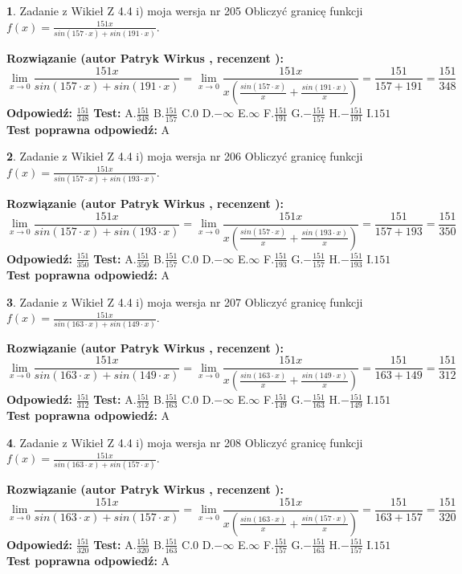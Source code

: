 \documentclass[12pt, a4paper]{article}
\theoremstyle{definition} %
\newtheorem{zad}{}
\newcommand{\zadStart}[1]{\begin{zad}#1\newline}
\newcommand{\zadStop}{\end{zad}}
\newcommand{\rozwStart}[2]{\noindent \textbf{Rozwiązanie (autor #1 , recenzent #2): }\newline}
\newcommand{\rozwStop}{\newline}
\newcommand{\odpStart}{\noindent \textbf{Odpowiedź:}\newline}
\newcommand{\odpStop}{\newline}
\newcommand{\testStart}{\noindent \textbf{Test:}\newline}
\newcommand{\testStop}{\newline}
\newcommand{\kluczStart}{\noindent \textbf{Test poprawna odpowiedź:}\newline}
\newcommand{\kluczStop}{\newline}
\begin{document}
\zadStart{Zadanie z Wikieł Z 4.4 i) moja wersja nr 205}
Obliczyć granicę funkcji $f(x)=\frac{151x}{sin(157\cdot x) +sin(191\cdot x)}$.
\zadStop
\rozwStart{Patryk Wirkus}{}
$$\lim\limits_{x\to 0}\frac{151x}{sin(157\cdot x) +sin(191\cdot x)}=\lim\limits_{x\to 0}\frac{151x}{x(\frac{sin(157\cdot x)}{x}+\frac{sin(191\cdot x)}{x})}=\frac{151}{157+191} = \frac{151}{348}$$
\rozwStop
\odpStart
$\frac{151}{348}$
\odpStop
\testStart
A.$\frac{151}{348}$
B.$\frac{151}{157}$
C.$0$
D.$-\infty$
E.$\infty$
F.$\frac{151}{191}$
G.$-\frac{151}{157}$
H.$-\frac{151}{191}$
I.$151$
\testStop
\kluczStart
A
\kluczStop



\zadStart{Zadanie z Wikieł Z 4.4 i) moja wersja nr 206}
Obliczyć granicę funkcji $f(x)=\frac{151x}{sin(157\cdot x) +sin(193\cdot x)}$.
\zadStop
\rozwStart{Patryk Wirkus}{}
$$\lim\limits_{x\to 0}\frac{151x}{sin(157\cdot x) +sin(193\cdot x)}=\lim\limits_{x\to 0}\frac{151x}{x(\frac{sin(157\cdot x)}{x}+\frac{sin(193\cdot x)}{x})}=\frac{151}{157+193} = \frac{151}{350}$$
\rozwStop
\odpStart
$\frac{151}{350}$
\odpStop
\testStart
A.$\frac{151}{350}$
B.$\frac{151}{157}$
C.$0$
D.$-\infty$
E.$\infty$
F.$\frac{151}{193}$
G.$-\frac{151}{157}$
H.$-\frac{151}{193}$
I.$151$
\testStop
\kluczStart
A
\kluczStop



\zadStart{Zadanie z Wikieł Z 4.4 i) moja wersja nr 207}
Obliczyć granicę funkcji $f(x)=\frac{151x}{sin(163\cdot x) +sin(149\cdot x)}$.
\zadStop
\rozwStart{Patryk Wirkus}{}
$$\lim\limits_{x\to 0}\frac{151x}{sin(163\cdot x) +sin(149\cdot x)}=\lim\limits_{x\to 0}\frac{151x}{x(\frac{sin(163\cdot x)}{x}+\frac{sin(149\cdot x)}{x})}=\frac{151}{163+149} = \frac{151}{312}$$
\rozwStop
\odpStart
$\frac{151}{312}$
\odpStop
\testStart
A.$\frac{151}{312}$
B.$\frac{151}{163}$
C.$0$
D.$-\infty$
E.$\infty$
F.$\frac{151}{149}$
G.$-\frac{151}{163}$
H.$-\frac{151}{149}$
I.$151$
\testStop
\kluczStart
A
\kluczStop



\zadStart{Zadanie z Wikieł Z 4.4 i) moja wersja nr 208}
Obliczyć granicę funkcji $f(x)=\frac{151x}{sin(163\cdot x) +sin(157\cdot x)}$.
\zadStop
\rozwStart{Patryk Wirkus}{}
$$\lim\limits_{x\to 0}\frac{151x}{sin(163\cdot x) +sin(157\cdot x)}=\lim\limits_{x\to 0}\frac{151x}{x(\frac{sin(163\cdot x)}{x}+\frac{sin(157\cdot x)}{x})}=\frac{151}{163+157} = \frac{151}{320}$$
\rozwStop
\odpStart
$\frac{151}{320}$
\odpStop
\testStart
A.$\frac{151}{320}$
B.$\frac{151}{163}$
C.$0$
D.$-\infty$
E.$\infty$
F.$\frac{151}{157}$
G.$-\frac{151}{163}$
H.$-\frac{151}{157}$
I.$151$
\testStop
\kluczStart
A
\kluczStop
\end{document}
